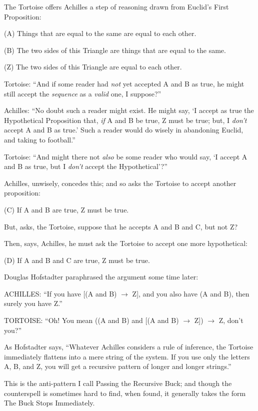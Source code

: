 {
 The Tortoise offers Achilles a step of reasoning drawn from
Euclid's First Proposition:}

{
 (A) Things that are equal to the same are equal to each other.}

{
 (B) The two sides of this Triangle are things that are equal to
the same.}

{
 (Z) The two sides of this Triangle are equal to each other.}

{
 Tortoise: ``And if some reader had \textit{not}
yet accepted A and B as true, he might still accept the
\textit{sequence} as a \textit{valid} one, I
suppose?''}

{
 Achilles: ``No doubt such a reader might exist.
He might say, `I accept as true the Hypothetical
Proposition that, \textit{if} A and B be true, Z must be true; but, I
\textit{don't} accept A and B as true.'
Such a reader would do wisely in abandoning Euclid, and taking to
football.''}

{
 Tortoise: ``And might there not \textit{also} be
some reader who would say, `I accept A and B as true,
but I \textit{don't} accept the
Hypothetical'?''}

{
 Achilles, unwisely, concedes this; and so asks the Tortoise to
accept another proposition:}

{
 (C) If A and B are true, Z must be true.}

{
 But, asks, the Tortoise, suppose that he accepts A and B and C,
but not Z?}

{
 Then, says, Achilles, he must ask the Tortoise to accept one more
hypothetical:}

{
 (D) If A and B and C are true, Z must be true.}

{
 Douglas Hofstadter paraphrased the argument some time later:}

{
 ACHILLES: ``If you have [(A and B) $\rightarrow $
Z], and you also have (A and B), then surely you have
Z.''}

{
 TORTOISE: ``Oh! You mean ((A and B) and [(A and
B) $\rightarrow $ Z]) $\rightarrow $ Z, don't
you?''}

{
 As Hofstadter says, ``Whatever Achilles considers
a rule of inference, the Tortoise immediately flattens into a mere
string of the system. If you use only the letters A, B, and Z, you will
get a recursive pattern of longer and longer
strings.''}

{
 This is the anti-pattern I call Passing the Recursive Buck; and
though the counterspell is sometimes hard to find, when found, it
generally takes the form The Buck Stops Immediately.}

